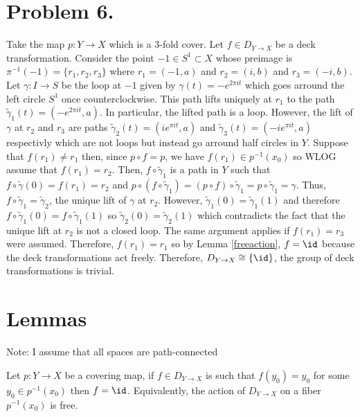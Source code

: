 \documentclass[12pt]{extarticle}
\begin{document}
\section*{Problem 6.}

Take the map $p : Y \to X$ which is a $3$-fold cover. Let $f \in D_{Y \to X}$ be a deck transformation. Consider the point $-1 \in S^1 \subset X$ whose preimage is $\pi^{-1}(-1) = \{r_1, r_2, r_3\}$ where $r_1 = (-1, a)$ and $r_2 = (i, b)$ and $r_3 = (-i, b)$. Let $\gamma : I \to S$ be the loop at $-1$ given by $\gamma(t) = - e^{2 \pi i t}$ which goes arround the left circle $S^1$ once counterclockwise. This path lifts uniquely at $r_1$ to the path $\tilde{\gamma}_1(t) = (-e^{2 \pi i t}, a)$. In particular, the lifted path is a loop. However, the lift of $\gamma$ at $r_2$ and $r_3$ are paths $\tilde{\gamma}_2(t) = (ie^{\pi i t}, a)$ and $\tilde{\gamma}_3(t) = (-ie^{\pi i t}, a)$   respectivly which are not loops but instead go arround half circles in $Y$. Suppose that $f(r_1) \neq r_1$ then, since $p \circ f = p$, we have $f(r_1) \in p^{-1}(x_0)$ so WLOG assume that $f(r_1) = r_2$. Then, $f \circ \tilde{\gamma}_1$ is a path in $Y$ such that $f \circ \tilde{\gamma}(0) = f(r_1) = r_2$ and $p \circ (f \circ \tilde{\gamma}_1) = (p \circ f) \circ \tilde{\gamma}_1 = p \circ \tilde{\gamma}_1 = \gamma$. Thus, $f \circ \tilde{\gamma}_1 = \tilde{\gamma}_2$, the unique lift of $\gamma$ at $r_2$. However, $\tilde{\gamma}_1(0) = \tilde{\gamma}_1(1)$ and therefore $f \circ \tilde{\gamma}_1(0) = f \circ \tilde{\gamma}_1(1)$ so $\tilde{\gamma}_2(0) = \tilde{\gamma}_2(1)$ which contradicts the fact that the unique lift at $r_2$ is not a closed loop. The same argument applies if $f(r_1) = r_3$ were assumed. Therefore, $f(r_1) = r_1$ so by Lemma \ref{freeaction}, $f = \id$ because the deck transformations act freely. Therefore, $D_{Y \to X} \cong \{\id\}$, the group of deck transformations is trivial. 
              
\section*{Lemmas}

Note: I assume that all spaces are path-connected

\begin{lemma} \label{freeaction}
Let $p : Y \to X$ be a covering map, if $f \in D_{Y \to X}$ is such that $f(y_0) = y_0$ for some $y_0 \in p^{-1}(x_0)$ then $f = \id$. Equivalently, the action of $D_{Y \to X}$ on a fiber $p^{-1}(x_0)$ is free. 
\end{lemma}
\end{document}
